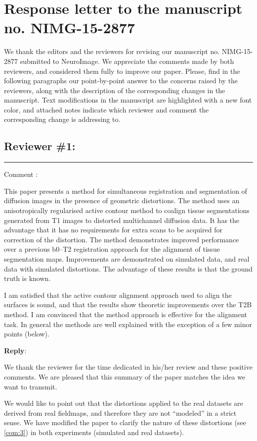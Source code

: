 \documentclass[9pt]{memoir}
\newcounter{reviewpoint}
\newenvironment{reviewpoint}%
{\refstepcounter{reviewpoint}\par\medskip\vspace{3ex}\hrule\vspace{1.5ex}\par\noindent%
   {\fontseries{b}\selectfont Comment \arabic{reviewpoint}:}
   \begingroup%
   \color{black!60}
   \fontshape{it}\selectfont %

}
{\endgroup\label{com:\thereviewpoint}\par\medskip}
\newcommand{\reply}{\par\fontshape{n}\selectfont \noindent \textbf{Reply}:\ }
\begin{document}
\hypersetup{linkcolor=black!60, citecolor=black!60, urlcolor=black!60}

\section*{Response letter to the manuscript no. NIMG-15-2877}

\bigskip
\noindent We thank the editors and the reviewers for revising our manuscript no. NIMG-15-2877 submitted to NeuroImage.
We appreciate the comments made by both reviewers, and considered them fully to improve our paper.
Please, find in the following paragraphs our point-by-point answer to the concerns raised by the reviewers,
  along with the description of the corresponding changes in the manuscript.
Text modifications in the manuscript are highlighted with a new font color, and attached notes indicate 
  which reviewer and comment the corresponding change is addressing to.

\bigskip
\bigskip
\subsection*{Reviewer \#1:}
\begin{reviewpoint}
This paper presents a method for simultaneous registration and segmentation of diffusion images in the presence of geometric distortions. The method uses an anisotropically regularised active contour method to coalign tissue segmentations generated from T1 images to distorted multichannel diffusion data. It has the advantage that it has no requirements for extra scans to be acquired for correction of the distortion. The method demonstrates improved performance over a previous b0--T2 registration approach for the alignment of tissue segmentation maps. Improvements are demonstrated on simulated data, and real data with simulated distortions. The advantage of these results is that the ground truth is known.


I am satisfied that the active contour alignment approach used to align the surfaces is sound, and that the results show theoretic improvements over the T2B method. I am convinced that the method approach is effective for the alignment task. In general the methods are well explained with the exception of a few minor points (below).
\end{reviewpoint}
\reply{%
We thank the reviewer for the time dedicated in his/her review and these positive comments.
We are pleased that this summary of the paper matches the idea we want to transmit.

We would like to point out that the distortions applied to the real datasets are derived from
  real fieldmaps, and therefore they are not ``modeled'' in a strict sense.
We have modified the paper to clarify the nature of these distortions (see \autoref{com:3}) in
  both experiments (simulated and real datasets).
}
\end{document}
